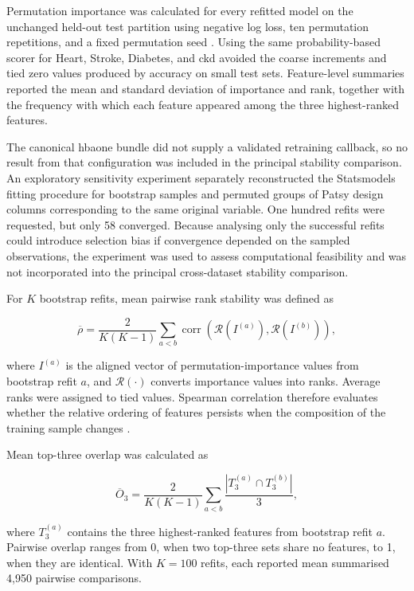 Permutation importance was calculated for every refitted model on the unchanged held-out test partition using negative log loss, ten permutation repetitions, and a fixed permutation seed \citep{fisher_models_2019}. Using the same probability-based scorer for Heart, Stroke, Diabetes, and \gls{ckd} avoided the coarse increments and tied zero values produced by accuracy on small test sets. Feature-level summaries reported the mean and standard deviation of importance and rank, together with the frequency with which each feature appeared among the three highest-ranked features.

The canonical \gls{hbaone} bundle did not supply a validated retraining callback, so no result from that configuration was included in the principal stability comparison. An exploratory sensitivity experiment separately reconstructed the Statsmodels fitting procedure for bootstrap samples and permuted groups of Patsy design columns corresponding to the same original variable. One hundred refits were requested, but only 58 converged. Because analysing only the successful refits could introduce selection bias if convergence depended on the sampled observations, the experiment was used to assess computational feasibility and was not incorporated into the principal cross-dataset stability comparison.

For $K$ bootstrap refits, mean pairwise rank stability was defined as

\begin{equation}
\overline{\rho}
=
\frac{2}{K(K-1)}
\sum_{a<b}
\operatorname{corr}
\left(
\mathcal{R}\left(I^{(a)}\right),
\mathcal{R}\left(I^{(b)}\right)
\right),
\end{equation}

where $I^{(a)}$ is the aligned vector of permutation-importance values from bootstrap refit $a$, and $\mathcal{R}(\cdot)$ converts importance values into ranks. Average ranks were assigned to tied values. Spearman correlation therefore evaluates whether the relative ordering of features persists when the composition of the training sample changes \citep{spearman_proof_1904}.

Mean top-three overlap was calculated as

\begin{equation}
\overline{O}_3
=
\frac{2}{K(K-1)}
\sum_{a<b}
\frac{
\left|T_3^{(a)}\cap T_3^{(b)}\right|
}{3},
\end{equation}

where $T_3^{(a)}$ contains the three highest-ranked features from bootstrap refit $a$. Pairwise overlap ranges from 0, when two top-three sets share no features, to 1, when they are identical. With $K=100$ refits, each reported mean summarised 4,950 pairwise comparisons.

